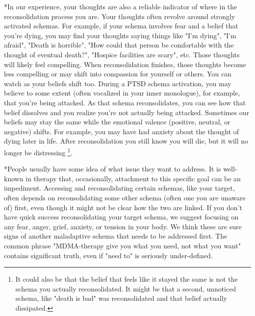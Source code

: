 \documentclass[12pt,letterpaper]{article}
\begin{document}
*In our experience, your thoughts are also a reliable indicator of where in the reconsolidation process you are. Your thoughts often revolve around strongly activated schemas. For example, if your schema involves fear and a belief that you're dying, you may find your thoughts saying things like "I'm dying", "I'm afraid", "Death is horrible", "How could that person be comfortable with the thought of eventual death?", "Hospice facilities are scary", etc. Those thoughts will likely feel compelling. When reconsolidation finishes, those thoughts become less compelling or may shift into compassion for yourself or others. You can watch as your beliefs shift too. During a PTSD schema activation, you may believe to some extent (often vocalized in your inner monologue), for example, that you're being attacked. As that schema reconsolidates, you can see how that belief dissolves and you realize you're not actually being attacked. Sometimes our beliefs may stay the same while the emotional valence (positive, neutral, or negative) shifts. For example, you may have had anxiety about the thought of dying later in life. After reconsolidation you still know you will die, but it will no longer be distressing \footnote{It could also be that the belief that feels like it stayed the same is not the schema you actually reconsolidated. It might be that a second, unnoticed schema, like "death is bad" was reconsolidated and that belief actually dissipated.}.

*People usually have some idea of what issue they want to address. It is well-known in therapy that, occasionally, attachment to this specific goal can be an impediment. Accessing and reconsolidating certain schemas, like your target, often depends on reconsolidating some other schema (often one you are unaware of) first, even though it might not be clear how the two are linked. If you don't have quick success reconsolidating your target schema, we suggest focusing on any fear, anger, grief, anxiety, or tension in your body. We think these are sure signs of another maladaptive schema that needs to be addressed first. The common phrase "MDMA-therapy give you what you need, not what you want" contains significant truth, even if "need to" is seriously under-defined.
\end{document}
